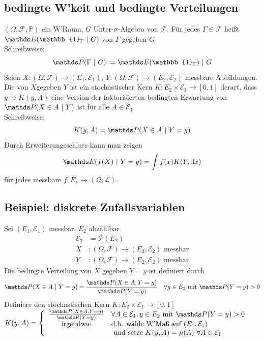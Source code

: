 
\subsection{bedingte W'keit und bedingte Verteilungen}
\label{sub:bed_wk_vert}
$(\Omega,\mathcal{F},\mathds{P})$ ein W'Raum, $G$ Unter-$\sigma$-Algebra von $\mathcal{F}$. Für jedes $\Gamma\in \mathcal{F}$ heißt $\E(\mathbb{1}_\Gamma~|~G)$  von $\Gamma$ gegeben $G$\\
Schreibweise: \[\Pw(\Gamma~|~G):=\E(\mathbb{1}_\Gamma)~|~G \]
Seien $X:(\Omega,\mathcal{F})\to (E_1,\mathcal{E}_1)$, $Y:(\Omega,\mathcal{F})\to (E_2,\mathcal{E}_2)$ messbare Abbildungen.\\
Die  von $X$gegeben $Y$ ist ein stochastischer Kern $K:E_2\times \mathcal{E}_1\to [0,1]$ derart, dass $y\mapsto K(y,A)$ eine Version der faktorisierten bedingten Erwartung von $\Pw(X\in A~|~Y)$ ist für alle $A\in\mathcal{E}_1$.\\
Schreibweise: \[K(y,A)=\Pw(X\in A~|~Y=y) \]
Durch Erweiterungsschluss kann man zeigen \[\E(f(X)~|~Y=y)= \int f(x) K(Y,\dint x) \]
für jedes messbare $f:E_1\to(\Omega,\mathcal{L})$.

\subsection{Beispiel: diskrete Zufallsvariablen}
\label{sub:bsp_dis_zv}
Sei $(E_1,\mathcal{E}_1)$ messbar, $E_2$ abzählbar
\begin{equation*}
\begin{aligned}
	\mathcal{E}_2 &= \mathcal{P}(E_2)\\
	X &: (\Omega,\mathcal{F})\to (E_2,\mathcal{E}_2) \text{ messbar}\\
	Y &: (\Omega,\mathcal{F})\to (E_2,\mathcal{E}_2)\text{ messbar}
\end{aligned}
\end{equation*}
Die bedingte Verteilung von $X$ gegeben $Y=y$ ist definiert durch \[\Pw(X\in A~|~Y=y)=\frac{\Pw(X\in A,Y=y)}{\Pw(Y=y)}\quad \forall y\in E_2 \text{ mit } \Pw(Y=y)>0 \]
Definiere den stochastischen Kern $K: E_2\times \mathcal{E}_1\to [0,1]$\\
$K(y,A)=\left\{\begin{array}{cl} 
\frac{\Pw(X\in A,Y=y)}{\Pw(Y=y)} & \forall A\in \mathcal{E}_1,y\in E_2 \text{ mit }\Pw(Y=y)>0\\
\text{irgendwie} & \text{d.h. wähle W'Maß auf } (E_1,\mathcal{E}_1)\\
	& \text{ und setze } K(y,A)=\mu(A)~\forall A\in \mathcal{E}_1  \end{array}\right.$\\

